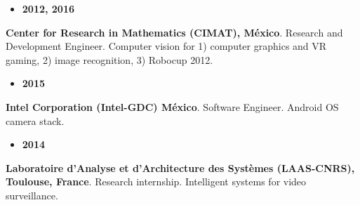 \documentclass[10 pt]{article}
\begin{document}
%
\begin{minipage}[t][1cm]{0.12\textwidth}
\setlength{\leftmargini}{0.1em}
\begin{itemize}
\item \textbf{2012, 2016}
\end{itemize}

\end{minipage}\begin{minipage}[t][1cm]{0.85\textwidth}

\textbf{Center for Research in Mathematics (CIMAT), México}. Research and Development Engineer.
Computer vision for
1) computer graphics and VR gaming,
2) image recognition,
3) Robocup 2012.
\end{minipage}
%

\begin{minipage}[t][.6cm]{0.12\textwidth}
\setlength{\leftmargini}{0.1em}
\begin{itemize}
%
\item \textbf{2015}
%
\end{itemize}
\end{minipage}\begin{minipage}[t][.6cm]{0.85\textwidth}

\textbf{Intel Corporation (Intel-GDC) México}. Software Engineer. Android OS camera stack.

\end{minipage}
%

\vspace{0.15cm}
\begin{minipage}[t][1.1cm]{0.12\textwidth}
\setlength{\leftmargini}{0.1em}
\begin{itemize}
%
\item \textbf{2014}
%
\end{itemize}
\end{minipage}\begin{minipage}[t][1.4cm]{0.85\textwidth}
%
\textbf{Laboratoire d'Analyse et d'Architecture des Systèmes (LAAS-CNRS), Toulouse, France}.
 Research internship. Intelligent systems for video surveillance.
%
%
\end{minipage}
%
\end{document}
